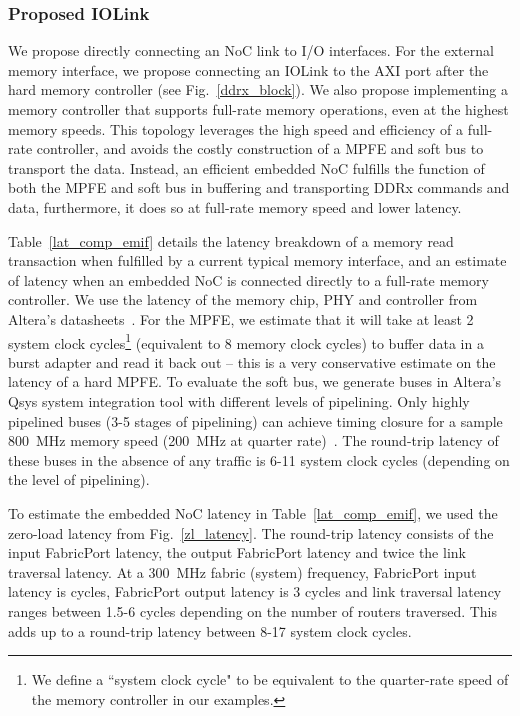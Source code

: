 \subsubsection{Proposed IOLink}
%

We propose directly connecting an NoC link to I/O interfaces.
For the external memory interface, we propose connecting an IOLink to the AXI port after the hard memory controller (see Fig.~\ref{ddrx_block}).
We also propose implementing a memory controller that supports full-rate memory operations, even at the highest memory speeds.
This topology leverages the high speed and efficiency of a full-rate controller, and avoids the costly construction of a MPFE and soft bus to transport the data.
Instead, an efficient embedded NoC fulfills the function of both the MPFE and soft bus in buffering and transporting DDRx commands and data, furthermore, it does so at full-rate memory speed and lower latency.

Table~\ref{lat_comp_emif} details the latency breakdown of a memory read transaction when fulfilled by a current typical memory interface, and an estimate of latency when an embedded NoC is connected directly to a full-rate memory controller.
We use the latency of the memory chip, PHY and controller from Altera's datasheets~\cite{emif}.
For the MPFE, we estimate that it will take at least 2 system clock cycles\footnote{We define a ``system clock cycle" to be equivalent to the quarter-rate speed of the memory controller in our examples.} (equivalent to 8 memory clock cycles) to buffer data in a burst adapter and read it back out -- this is a very conservative estimate on the latency of a hard MPFE.
To evaluate the soft bus, we generate buses in Altera's Qsys system integration tool with different levels of pipelining.
Only highly pipelined buses (3-5 stages of pipelining) can achieve timing closure for a sample 800~MHz memory speed (200~MHz at quarter rate)~\cite{micro}.
The round-trip latency of these buses in the absence of any traffic is 6-11 system clock cycles (depending on the level of pipelining).

To estimate the embedded NoC latency in Table~\ref{lat_comp_emif}, we used the zero-load latency from Fig.~\ref{zl_latency}.
The round-trip latency consists of the input FabricPort latency, the output FabricPort latency and twice the link traversal latency.
At a 300~MHz fabric (system) frequency, FabricPort input latency is  cycles, FabricPort output latency is 3 cycles and link traversal latency ranges between 1.5-6 cycles depending on the number of routers traversed.
This adds up to a round-trip latency between 8-17 system clock cycles.

